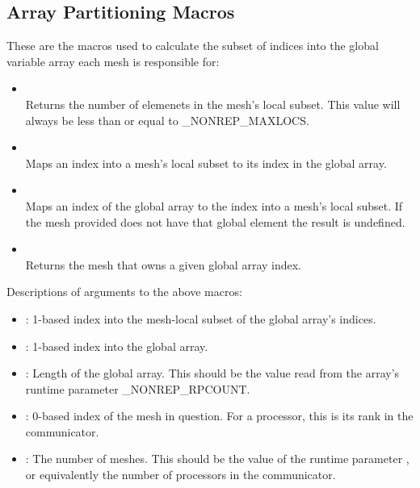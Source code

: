 \subsection{Array Partitioning Macros}
These are the macros used to calculate the subset of indices into the global
variable array each mesh is responsible for:
\begin{itemize}
\item {}\\
Returns the number of elemenets in the mesh's local subset.  This value will always
be less than or equal to _NONREP_MAXLOCS.
\item {}\\
Maps an index into a mesh's local subset to its index in the global array.
\item {}\\
Maps an index of the global array to the index into a mesh's local subset.  If the
mesh provided does not have that global element the result is undefined.
\item {}\\
Returns the mesh that owns a given global array index.
\end{itemize}

Descriptions of arguments to the above macros:
\begin{itemize}
\item {}:  1-based index into the mesh-local subset of the global array's indices.\\
\item {}:  1-based index into the global array.\\
\item {}:  Length of the global array.  This should be the value read from
the array's runtime parameter _NONREP_RPCOUNT.
\item {}:  0-based index of the mesh in question.  For a processor, this is
its rank in the  communicator.\\
\item {}:  The number of meshes.  This should be the value of the runtime parameter
, or equivalently the number of processors in the
 communicator.\\
\end{itemize}

